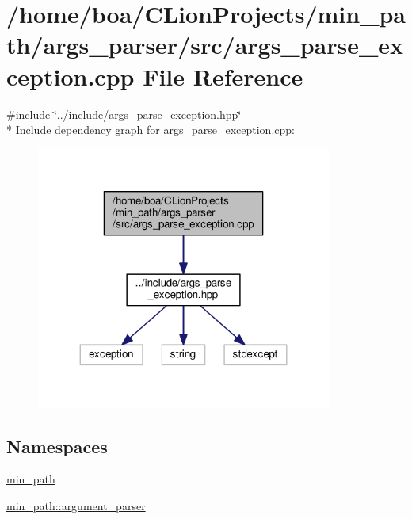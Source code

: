 \hypertarget{a00012}{}\section{/home/boa/\+C\+Lion\+Projects/min\+\_\+path/args\+\_\+parser/src/args\+\_\+parse\+\_\+exception.cpp File Reference}
\label{a00012}
{\ttfamily \#include \char`\"{}../include/args\+\_\+parse\+\_\+exception.\+hpp\char`\"{}}\\*
Include dependency graph for args\+\_\+parse\+\_\+exception.\+cpp\+:
\nopagebreak
\begin{figure}[H]
\begin{center}
\leavevmode
\includegraphics[width=275pt]{d5/db6/a00042}
\end{center}
\end{figure}
\subsection*{Namespaces}
\begin{DoxyCompactItemize}
\item 
 \hyperlink{a00033}{min\+\_\+path}
\item 
 \hyperlink{a00034}{min\+\_\+path\+::argument\+\_\+parser}
\end{DoxyCompactItemize}
